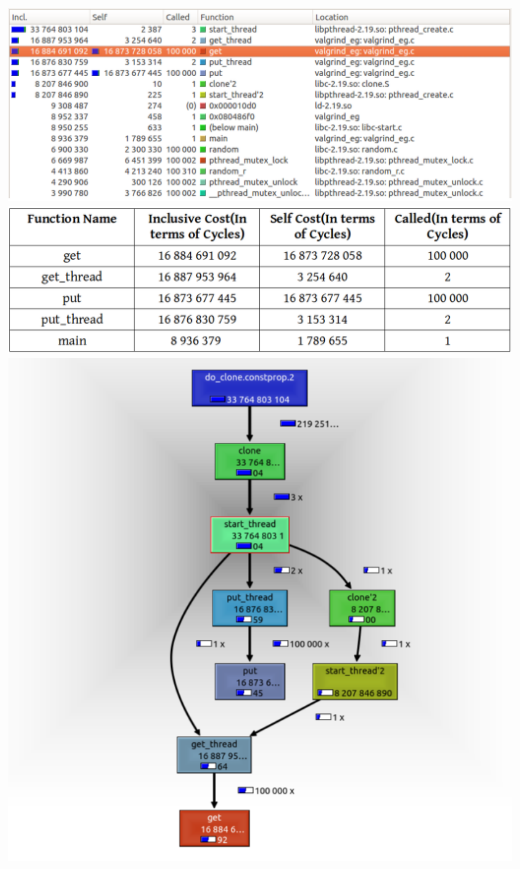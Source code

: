\documentclass{sem5}
\begin{document}
\begin{enumerate}
\begin{itemize}
\centering
\includegraphics[scale=.4]{pic4.png}
\centering
\includegraphics[scale=.4]{pic5.png}
\centering
\includegraphics[scale=.4]{pic6.png}

\end{itemize}
\end{enumerate}
\end{document}
